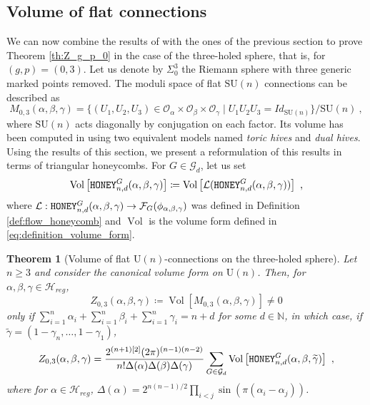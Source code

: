 \documentclass[11pt,a4paper]{amsart}
\providecommand{\U}{\mathrm U}
\providecommand{\SU}{\mathrm {SU}}
\providecommand{\Vol}{\operatorname{Vol}}
\providecommand{\honey}{\texttt{\textsc{HONEY}}}
\numberwithin{equation}{section}
\newtheorem{theorem}{Theorem}[section]
\theoremstyle{definition}
\begin{document}
\subsection{Volume of flat connections}
\label{subsec:main_th_three_holed_sphere}

We can now combine the results of \autocite{françois2024positiveformulaproductconjugacy} 
with the ones of the previous section to prove Theorem \ref{th:Z_g_p_0} in the 
case of the three-holed sphere, that is, for $(g, p) = (0, 3)$.
Let us denote by $\Sigma_0^3$ the Riemann sphere with three generic marked points removed. 
The moduli space of flat $\SU(n)$ connections can be described as 
$$M_{0, 3}(\alpha,\beta,\gamma) = 
\{(U_1,U_2,U_3)\in \mathcal{O}_{\alpha} \times 
\mathcal{O}_{\beta}\times \mathcal{O}_{\gamma} \mid U_1U_2U_3=Id_{\SU(n)}\}/\SU(n) \ ,$$
where $\SU(n)$ acts diagonally by conjugation on each factor. 
Its volume has been computed in \autocite{françois2024positiveformulaproductconjugacy} 
using two equivalent 
models named \textit{toric hives} and \textit{dual hives}. 
Using the results of this section, we present a reformulation of this results 
in terms of triangular honeycombs. For $G \in \mathcal{G}_d$, let us set  
\begin{equation}
    \label{eq:def_volume_honey_with_L}
    \Vol\left[\honey_{n,d}^G(\alpha,\beta,\gamma)\right] \coloneqq 
    \Vol \left[ \mathcal{L}( \honey_{n,d}^G(\alpha,\beta,\gamma)) \right] \ ,
\end{equation}
where $\mathcal{L} : \honey_{n,d}^G(\alpha,\beta,\gamma) \to 
\mathcal{F}_G(\phi_{\alpha,\beta,\gamma})$ was defined in Definition 
\ref{def:flow_honeycomb} and $\Vol$ is the volume form defined 
in \eqref{eq:definition_volume_form}.



\begin{theorem}[Volume of flat $\U(n)$-connections on the three-holed sphere]
    \label{th:volume_flat_connection_0_3}
    Let $n\geqslant 3$ and consider the canonical volume form on $\U(n)$. 
    Then, for $\alpha,\beta,\gamma\in \mathcal{H}_{reg}$, 
    \begin{equation*}
        Z_{0, 3}(\alpha,\beta,\gamma) \coloneqq 
        \Vol \left[ M_{0, 3}(\alpha,\beta,\gamma) \right] \not=0 
    \end{equation*}
    only if $\sum_{i=1}^n\alpha_i+\sum_{i=1}^n\beta_i+\sum_{i=1}^n\gamma_i=n+d$ 
    for some $d\in\mathbb{N}$, in which case, 
    if $\widetilde{\gamma}=(1-\gamma_n,\ldots,1-\gamma_1)$,
    \begin{equation*}
        Z_{0, 3}(\alpha,\beta,\gamma) = 
        \frac{2^{(n+1) [2]}(2\pi)^{(n-1)(n-2)}} 
        {n! \Delta(\alpha) \Delta(\beta) \Delta(\gamma)} 
        \sum_{G\in\mathcal{G}_d} 
        \Vol \left[\honey_{n,d}^G(\alpha,\beta,\widetilde{\gamma})\right] \ ,
    \end{equation*}
    where for $\alpha \in \mathcal{H}_{reg}$, $\Delta(\alpha) 
    = 2^{n(n-1)/2} \prod_{i < j} \sin (\pi(\alpha_i - \alpha_j))$.
\end{theorem}
\end{document}
